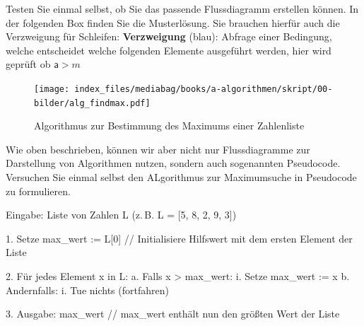 \documentclass[
  letterpaper,
  DIV=11,
  numbers=noendperiod]{scrreprt}
\newenvironment{Shaded}{\begin{snugshade}}{\end{snugshade}}
\newcommand{\NormalTok}[1]{\textcolor[rgb]{0.00,0.23,0.31}{#1}}
\begin{document}
Testen Sie einmal selbst, ob Sie das passende Flussdiagramm erstellen
können. In der folgenden Box finden Sie die Musterlösung. Sie brauchen
hierfür auch die Verzweigung für Schleifen: \textbf{Verzweigung} (blau):
Abfrage einer Bedingung, welche entscheidet welche folgenden Elemente
ausgeführt werden, hier wird geprüft ob \(\mathsf a > m\)

\begin{tcolorbox}[enhanced jigsaw, left=2mm, leftrule=.75mm, bottomrule=.15mm, title=\textcolor{quarto-callout-caution-color}{\faFire}\hspace{0.5em}{Flussdiagramm: Maximumsuche}, colback=white, arc=.35mm, breakable, titlerule=0mm, bottomtitle=1mm, colbacktitle=quarto-callout-caution-color!10!white, toprule=.15mm, opacityback=0, coltitle=black, rightrule=.15mm, opacitybacktitle=0.6, toptitle=1mm, colframe=quarto-callout-caution-color-frame]

\begin{figure}[H]

{\centering \texttt{[image: index\_files/mediabag/books/a-algorithmen/skript/00-bilder/alg\_findmax.pdf]}

}

\caption{Algorithmus zur Bestimmung des Maximums einer Zahlenliste}

\end{figure}%

\end{tcolorbox}

Wie oben beschrieben, können wir aber nicht nur Flussdiagramme zur
Darstellung von Algorithmen nutzen, sondern auch sogenannten Pseudocode.
Versuchen Sie einmal selbst den ALgorithmus zur Maximumsuche in
Pseudocode zu formulieren.

\begin{tcolorbox}[enhanced jigsaw, left=2mm, leftrule=.75mm, bottomrule=.15mm, title=\textcolor{quarto-callout-caution-color}{\faFire}\hspace{0.5em}{Pseudocode: Maximumsuche}, colback=white, arc=.35mm, breakable, titlerule=0mm, bottomtitle=1mm, colbacktitle=quarto-callout-caution-color!10!white, toprule=.15mm, opacityback=0, coltitle=black, rightrule=.15mm, opacitybacktitle=0.6, toptitle=1mm, colframe=quarto-callout-caution-color-frame]

\begin{Shaded}
\begin{Highlighting}[]
\NormalTok{Eingabe: Liste von Zahlen L (z. B. L = [5, 8, 2, 9, 3])}

\NormalTok{1. Setze max\_wert := L[0]        // Initialisiere Hilfswert mit dem ersten Element der Liste}

\NormalTok{2. Für jedes Element x in L:}
\NormalTok{    a. Falls x \textgreater{} max\_wert:}
\NormalTok{        i. Setze max\_wert := x}
\NormalTok{    b. Andernfalls:}
\NormalTok{        i. Tue nichts (fortfahren)}

\NormalTok{3. Ausgabe: max\_wert             // max\_wert enthält nun den größten Wert der Liste}
\end{Highlighting}
\end{Shaded}

\end{tcolorbox}
\end{document}
